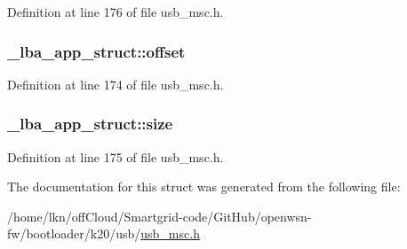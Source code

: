 Definition at line 176 of file usb\+\_\+msc.\+h.

\subsubsection[{\texorpdfstring{offset}{offset}}]{ \+\_\+lba\+\_\+app\+\_\+struct\+::offset}\hypertarget{struct__lba__app__struct_a0126cf44abc7a0ad2577a6f35fcd774b}{}\label{struct__lba__app__struct_a0126cf44abc7a0ad2577a6f35fcd774b}


Definition at line 174 of file usb\+\_\+msc.\+h.

\subsubsection[{\texorpdfstring{size}{size}}]{ \+\_\+lba\+\_\+app\+\_\+struct\+::size}\hypertarget{struct__lba__app__struct_a8cf1d6a0e2a2d91897d6e0b17ae5e7b1}{}\label{struct__lba__app__struct_a8cf1d6a0e2a2d91897d6e0b17ae5e7b1}


Definition at line 175 of file usb\+\_\+msc.\+h.



The documentation for this struct was generated from the following file\+:\begin{DoxyCompactItemize}
\item 
/home/lkn/off\+Cloud/\+Smartgrid-\/code/\+Git\+Hub/openwsn-\/fw/bootloader/k20/usb/\hyperlink{usb__msc_8h}{usb\+\_\+msc.\+h}\end{DoxyCompactItemize}
